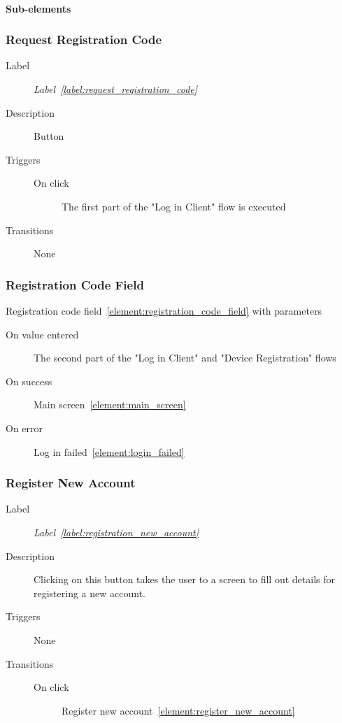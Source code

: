 \documentclass[a4paper,10pt]{article}
\newcommand{\labelLabelText}{Label}
\newcommand{\labelLabel}{label:}
\DeclareRobustCommand{\labelRef}[1]{%
   \emph{\labelLabelText~\ref{\labelLabel#1}}}
\newcommand{\elementLabel}{element:}
\DeclareRobustCommand{\elementRef}[1]{\ref{\elementLabel#1}}
\begin{document}
\paragraph{Sub-elements}

\subsubsection{Request Registration Code}
\begin{description}
 \item[Label] \labelRef{request_registration_code}
 \item[Description] Button
 \item[Triggers]\mbox{}
 \begin{description}
  \item[On click] The first part of the "Log in Client" flow is executed
 \end{description}
 \item[Transitions] None
\end{description}

\subsubsection{Registration Code Field}
Registration code field~\elementRef{registration_code_field} with parameters
\begin{description}
 \item[On value entered] The second part of the "Log in Client" and "Device 
Registration" flows
 \item[On success] Main screen~\elementRef{main_screen}
 \item[On error] Log in failed~\elementRef{login_failed}
\end{description}

\subsubsection{Register New Account}
\begin{description}
 \item[Label] \labelRef{registration_new_account}
 \item[Description] Clicking on this button takes the user to a screen to fill 
out details for registering a new account.
 \item[Triggers] None
 \item[Transitions]\mbox{}
  \begin{description}
   \item[On click] Register new account~\elementRef{register_new_account} 
  \end{description}
\end{description}
\end{document}
